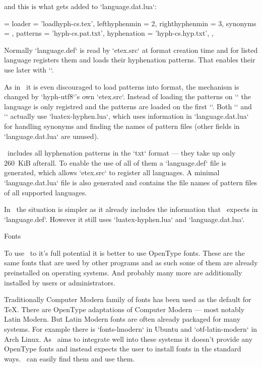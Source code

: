 and this is what gets added to `language.dat.lua`:

\begtt
	['czech'] = {
		loader = 'loadhyph-cs.tex',
		lefthyphenmin = 2,
		righthyphenmin = 3,
		synonyms = {  },
		patterns = 'hyph-cs.pat.txt',
		hyphenation = 'hyph-cs.hyp.txt',
	},
\endtt


Normally `language.def` is read by `etex.src` at format creation time and for
listed language registers them and loads their hyphenation patterns. That
enables their use later with `\uselanguage`.

As in \LuaTeX\ it is even discouraged to load patterns into format, the
mechanism is changed by `hyph-utf8`'s own `etex.src`. Instead of loading the
patterns on `\addlanguage` the language is only registred and the patterns are
loaded on the first `\uselanguage`. Both `\addlanguage` and `\uselangauge`
actually use `luatex-hyphen.lua`, which uses information in `language.dat.lua`
for handling synonyms and finding the names of pattern files (other fields in
`language.dat.lua` are unused).

\LLTeX\ includes all hyphenation patterns in the `txt` format --- they take up
only 260\ KiB afterall. To enable the use of all of them a `language.def` file
is generated, which allows `etex.src` to register all languages. A minimal
`language.dat.lua` file is also generated and contains the file names of
pattern files of all supported languages.

In \OpTeX\ the situation is simpler as it already includes the information that
\eTeX\ expects in  `language.def`. However it still uses `luatex-hyphen.lua`
and `language.dat.lua`.

\sec Fonts

To use \LuaTeX\ to it's full potential it is better to use OpenType fonts.
These are the same fonts that are used by other programs and as such some of
them are already preinstalled on operating systems. And probably many more are
additionally installed by users or administrators.

Traditionally Computer Modern family of fonts has been used as the default for
\TeX. There are OpenType adaptations of Computer Modern --- most notably Latin
Modern. But Latin Modern fonts are often already packaged for many systems. For
example there is `fonts-lmodern` in Ubuntu and `otf-latin-modern` in Arch
Linux. As \LLTeX\ aims to integrate well into these systems it doesn't provide
any OpenType fonts and instead expects the user to install fonts in the
standard ways. \LLTeX\ can easily find them and use them.

